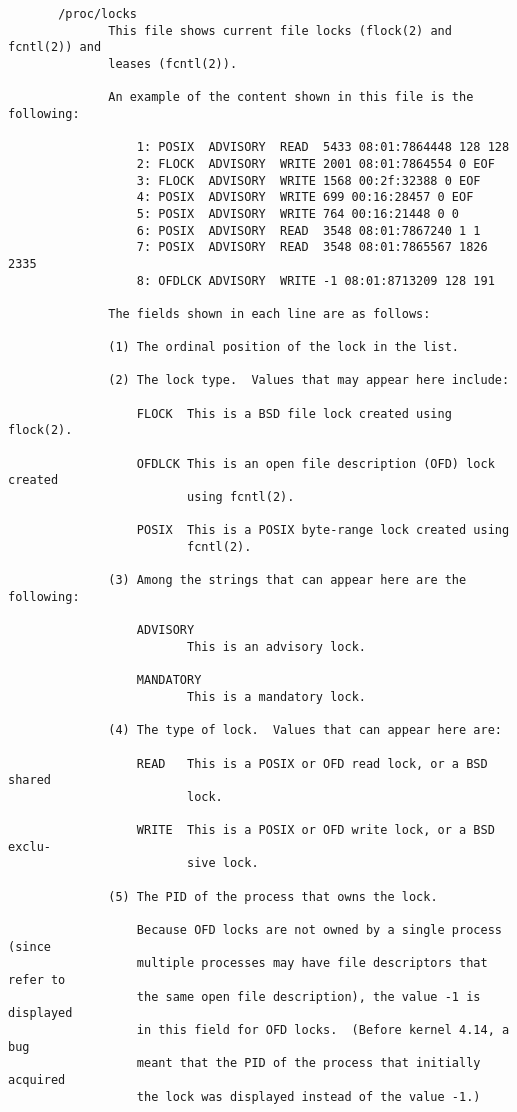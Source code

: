 \documentclass[]{article}
\begin{document}
\begin{verbatim}
       /proc/locks
              This file shows current file locks (flock(2) and fcntl(2)) and
              leases (fcntl(2)).

              An example of the content shown in this file is the following:

                  1: POSIX  ADVISORY  READ  5433 08:01:7864448 128 128
                  2: FLOCK  ADVISORY  WRITE 2001 08:01:7864554 0 EOF
                  3: FLOCK  ADVISORY  WRITE 1568 00:2f:32388 0 EOF
                  4: POSIX  ADVISORY  WRITE 699 00:16:28457 0 EOF
                  5: POSIX  ADVISORY  WRITE 764 00:16:21448 0 0
                  6: POSIX  ADVISORY  READ  3548 08:01:7867240 1 1
                  7: POSIX  ADVISORY  READ  3548 08:01:7865567 1826 2335
                  8: OFDLCK ADVISORY  WRITE -1 08:01:8713209 128 191

              The fields shown in each line are as follows:

              (1) The ordinal position of the lock in the list.

              (2) The lock type.  Values that may appear here include:

                  FLOCK  This is a BSD file lock created using flock(2).

                  OFDLCK This is an open file description (OFD) lock created
                         using fcntl(2).

                  POSIX  This is a POSIX byte-range lock created using
                         fcntl(2).

              (3) Among the strings that can appear here are the following:

                  ADVISORY
                         This is an advisory lock.

                  MANDATORY
                         This is a mandatory lock.

              (4) The type of lock.  Values that can appear here are:

                  READ   This is a POSIX or OFD read lock, or a BSD shared
                         lock.

                  WRITE  This is a POSIX or OFD write lock, or a BSD exclu‐
                         sive lock.

              (5) The PID of the process that owns the lock.

                  Because OFD locks are not owned by a single process (since
                  multiple processes may have file descriptors that refer to
                  the same open file description), the value -1 is displayed
                  in this field for OFD locks.  (Before kernel 4.14, a bug
                  meant that the PID of the process that initially acquired
                  the lock was displayed instead of the value -1.)


\end{verbatim}
\end{document}
